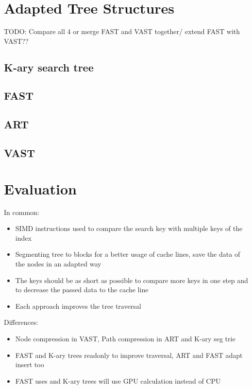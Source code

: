 \documentclass[conference]{IEEEtran}
\begin{document}
\section{Adapted Tree Structures}
TODO: Compare all 4 or merge FAST and VAST together/ extend FAST with VAST??
\subsection{K-ary search tree}\label{SCM}

\subsection{FAST}\label{SCM}

\subsection{ART}\label{SCM}

\subsection{VAST}\label{SCM}

\section{Evaluation}
In common:
\begin{itemize}
	\item SIMD instructions used to compare the search key with multiple keys of the index
	\item Segmenting tree to blocks for a better usage of cache lines, save the data of the nodes in an adapted way
	\item The keys should be as short as possible to compare more keys in one step and to decrease the passed data to the cache line
	\item Each approach improves the tree traversal
\end{itemize}

Differences:
\begin{itemize}
	\item Node compression in VAST, Path compression in ART and K-ary seg trie
	\item FAST and K-ary trees readonly to improve traversal, ART and FAST adapt insert too
	\item FAST uses and K-ary trees will use GPU calculation instead of CPU
\end{itemize}
\end{document}
